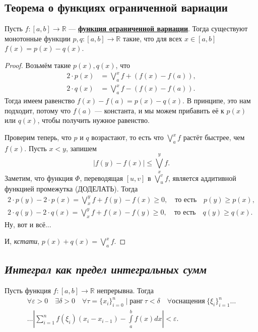 \subsection{Теорема о функциях ограниченной вариации}

\begin{theorem}
	Пусть \(f\colon [a, b] \to \mathbb{R}\) --- \hyperlink{orgvar}{\bfseries функция ограниченной вариации}. Тогда существуют монотонные функции \(p, q\colon [a, b] \to \mathbb{R}\) такие, что для всех \(x \in [a, b]\) \(f(x) = p(x) - q(x)\).
\end{theorem}
\begin{proof}
	Возьмём такие \(p(x), q(x)\), что
	\begin{align*}
		2 \cdot p(x) &= \bigvee_a^x f + (f(x) - f(a)), \\
		2 \cdot q(x) &= \bigvee_a^x f - (f(x) - f(a)).
	\end{align*}
	Тогда имеем равенство \(f(x) - f(a) = p(x) - q(x)\). В принципе, это нам подходит, потому что \(f(a)\) --- константа, и мы можем прибавить её к \(p(x)\) или \(q(x)\), чтобы получить нужное равенство.
	
	Проверим теперь, что \(p\) и \(q\) возрастают, то есть что \(\bigvee_a^x f\) растёт быстрее, чем \(f(x)\). Пусть \(x < y\), запишем \[
	|f(y) - f(x)| \leqslant \bigvee_x^y f.
	\]
	Заметим, что функция \(\Phi\), переводящая \([u, v]\) в \(\bigvee_u^v f\), является аддитивной функцией промежутка (ДОДЕЛАТЬ). Тогда
	\begin{gather*}
		2 \cdot p(y) - 2 \cdot p(x) = \bigvee_x^y f + f(y) - f(x) \geqslant 0, \quad \text{то есть} \quad p(y) \geqslant p(x), \\
		2 \cdot q(y) - 2 \cdot q(x) = \bigvee_x^y f + f(x) - f(y) \geqslant 0, \quad \text{то есть} \quad q(y) \geqslant q(x).
	\end{gather*}
	Ну, вот и всё...
	
	И, \textit{кстати}, \(p(x) + q(x) = \bigvee_a^x f\).
\end{proof}

\subsection{\itshape Интеграл как предел интегральных сумм}

\begin{theorem}
	Пусть функция \(f \colon [a, b] \to \mathbb{R}\) непрерывна. Тогда
	\begin{gather*}
		\forall \varepsilon > 0 \quad \exists \delta > 0 \quad \forall \tau = \{x_i\}_{i = 0}^n \mid \text{ранг} \ \tau < \delta \quad \forall \text{оснащения} \ \{\xi_i\}_{i = 1}^n \ldots \\
		\ldots \left|\sum_{i = 1}^n f(\xi_i) (x_i - x_{i - 1}) - \int\limits_a^b f(x) dx \right| < \varepsilon.
	\end{gather*}
\end{theorem}

